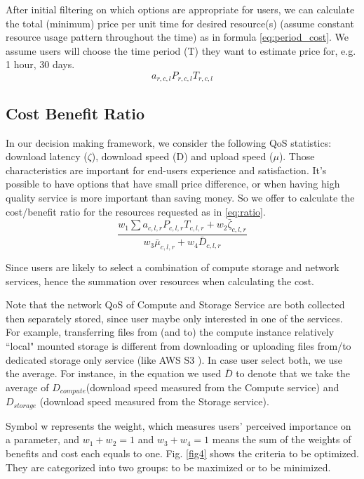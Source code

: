 After initial filtering on which options are appropriate for users, we can calculate the total (minimum) price per unit time for desired resource(s) (assume constant resource usage pattern throughout the time) as in formula \eqref{eq:period_cost}. We assume users will choose the time period (T) they want to estimate price for, e.g. 1 hour, 30 days.
\begin{equation}\label{eq:period_cost}
{a_{r,c,l}}{P_{r,c,l}}{T_{r,c,l}}
\end{equation}

\subsection{Cost Benefit Ratio}
\label{sec:cost_benefit_ratio}
In our decision making framework, we consider the following QoS statistics: download latency ($\zeta$), download speed (D) and upload speed ($\mu$). Those characteristics are important for end-users experience and satisfaction. It's possible to have options that have small price difference, or when having high quality service is more important than saving money. So we offer to calculate the cost/benefit ratio for the resources requested as in \eqref{eq:ratio}.
\begin{equation}\label{eq:ratio}
\frac{ w_1 \sum { a_{c,l,r} P_{c,l,r} T_{c,l,r} } + w_2 \bar\zeta_{c,l,r} } {w_3 \bar\mu_{c,l,r} + w_4\bar D_{c,l,r}}
\end{equation}

Since users are likely to select a combination of compute storage and network services, hence the summation over resources when calculating the cost.

Note that the network QoS of Compute and Storage Service are both collected then separately stored, since user maybe only interested in one of the services. For example, transferring files from (and to) the compute instance relatively ``local"  mounted storage is different from downloading or uploading files from/to dedicated storage only service (like AWS S3 \cite{S3}). In case user select both, we use the average. For instance, in the equation we used $\bar D$ to denote that we take the average of $D_{compute}$(download speed measured from the Compute service) and $D_{storage}$  (download speed measured from the Storage service).

Symbol w represents the weight, which measures users' perceived importance on a parameter, and $w_{1}+ w_{2}=1$ and $w_3+ w_4=1$ means the sum of the weights of benefits and cost each equals to one. Fig. \ref{fig4} shows the criteria to be optimized. They are categorized into two groups: to be maximized or to be minimized.

